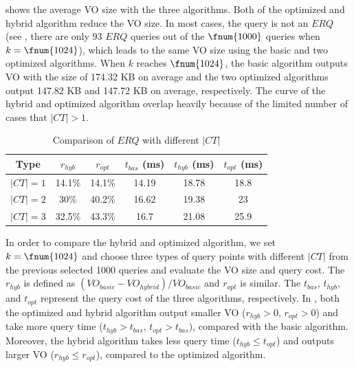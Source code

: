  shows the average VO size with the three algorithms. Both of the optimized and hybrid algorithm reduce the VO size. In most cases, the query is not an $ERQ$ (see , there are only $93$ $ERQ$ queries out of the $\fnum{1000}$ queries when $k=\fnum{1024}$), which leads to the same VO size using the basic and two optimized algorithms. When $k$ reaches $\fnum{1024}$, the basic algorithm outputs VO with the size of 174.32 KB on average and the two optimized algorithms output 147.82 KB and 147.72 KB on average, respectively. The curve of the hybrid and optimized algorithm overlap heavily because of the limited number of cases that $|CT|>1$.

\begin{table}[t]
  \centering
  \begin{tabular}{cccccc}
    \toprule
    Type   & $r_{hyb}$ & $r_{opt}$ & $t_{bas}$ (ms) & $t_{hyb}$ (ms) & $t_{opt}$ (ms) \\
    \midrule
    $|CT|=1$ & 14.1\%              & 14.1\%                 & 14.19      & 18.78       & 18.8           \\
    $|CT|=2$ & 30\%                & 40.2\%                 & 16.62      & 19.38       & 23             \\
    $|CT|=3$ & 32.5\%              & 43.3\%                 & 16.7       & 21.08       & 25.9           \\
    \bottomrule
  \end{tabular}
  \caption{Comparison of $ERQ$ with different $|CT|$}\label{tab:knn:erq-ct}
\end{table}

In order to compare the hybrid and optimized algorithm, we set $k=\fnum{1024}$ and choose three types of query points with different $|CT|$ from the previous selected 1000 queries and evaluate the VO size and query cost. The $r_{hyb}$ is defined as ${(VO_{basic}-VO_{hybrid})}/{VO_{basic}}$ and $r_{opt}$ is similar. The $t_{bas}$, $t_{hyb}$, and $t_{opt}$ represent the query cost of the three algorithms, respectively. In , both the optimized and hybrid algorithm output smaller VO ($r_{hyb}>0$, $r_{opt}>0$) and take more query time ($t_{hyb}>t_{bas}$, $t_{opt}>t_{bas}$), compared with the basic algorithm. Moreover, the hybrid algorithm takes less query time ($t_{hyb}\le t_{opt}$) and outputs larger VO ($r_{hyb}\le r_{opt}$), compared to the optimized algorithm.

